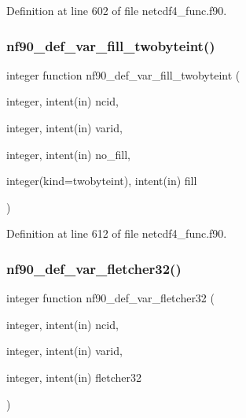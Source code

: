 Definition at line 602 of file netcdf4\+\_\+func.\+f90.

\mbox{\label{netcdf4__func_8f90_adab444302dc4463b369982de72f43d86}} 
\subsubsection{\texorpdfstring{nf90\+\_\+def\+\_\+var\+\_\+fill\+\_\+twobyteint()}{nf90\_def\_var\_fill\_twobyteint()}}
{\footnotesize\ttfamily integer function nf90\+\_\+def\+\_\+var\+\_\+fill\+\_\+twobyteint (\begin{DoxyParamCaption}\item[{integer, intent(in)}]{ncid,  }\item[{integer, intent(in)}]{varid,  }\item[{integer, intent(in)}]{no\+\_\+fill,  }\item[{integer(kind=twobyteint), intent(in)}]{fill }\end{DoxyParamCaption})}



Definition at line 612 of file netcdf4\+\_\+func.\+f90.

\mbox{\label{netcdf4__func_8f90_ae826d57b99e9d780892e68949cb83b87}} 
\subsubsection{\texorpdfstring{nf90\+\_\+def\+\_\+var\+\_\+fletcher32()}{nf90\_def\_var\_fletcher32()}}
{\footnotesize\ttfamily integer function nf90\+\_\+def\+\_\+var\+\_\+fletcher32 (\begin{DoxyParamCaption}\item[{integer, intent(in)}]{ncid,  }\item[{integer, intent(in)}]{varid,  }\item[{integer, intent(in)}]{fletcher32 }\end{DoxyParamCaption})}



